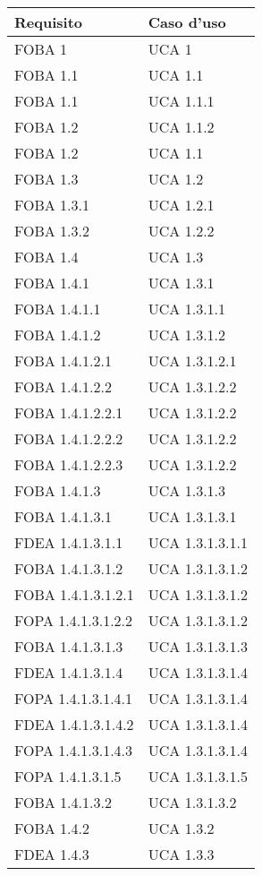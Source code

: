 \begin{longtable}{XX}
\toprule
\textbf{Requisito} & \textbf{Caso d'uso}\\
\midrule
FOBA 1&UCA 1\\
\midrule
FOBA 1.1&UCA 1.1\\
\midrule
FOBA 1.1&UCA 1.1.1\\
\midrule
FOBA 1.2&UCA 1.1.2\\
\midrule
FOBA 1.2&UCA 1.1\\
\midrule
FOBA 1.3&UCA 1.2\\
\midrule
FOBA 1.3.1&UCA 1.2.1\\
\midrule
FOBA 1.3.2&UCA 1.2.2\\
\midrule
FOBA 1.4&UCA 1.3\\
\midrule
FOBA 1.4.1&UCA 1.3.1\\
\midrule
FOBA 1.4.1.1&UCA 1.3.1.1\\
\midrule
FOBA 1.4.1.2&UCA 1.3.1.2\\
\midrule
FOBA 1.4.1.2.1&UCA 1.3.1.2.1\\
\midrule
FOBA 1.4.1.2.2&UCA 1.3.1.2.2\\
\midrule
FOBA 1.4.1.2.2.1&UCA 1.3.1.2.2\\
\midrule
FOBA 1.4.1.2.2.2&UCA 1.3.1.2.2\\
\midrule
FOBA 1.4.1.2.2.3&UCA 1.3.1.2.2\\
\midrule
FOBA 1.4.1.3&UCA 1.3.1.3\\
\midrule
FOBA 1.4.1.3.1&UCA 1.3.1.3.1\\
\midrule
FDEA 1.4.1.3.1.1&UCA 1.3.1.3.1.1\\
\midrule
FOBA 1.4.1.3.1.2&UCA 1.3.1.3.1.2\\
\midrule
FOBA 1.4.1.3.1.2.1&UCA 1.3.1.3.1.2\\
\midrule
FOPA 1.4.1.3.1.2.2&UCA 1.3.1.3.1.2\\
\midrule
FOBA 1.4.1.3.1.3&UCA 1.3.1.3.1.3\\
\midrule
FDEA 1.4.1.3.1.4&UCA 1.3.1.3.1.4\\
\midrule
FOPA 1.4.1.3.1.4.1&UCA 1.3.1.3.1.4\\
\midrule
FDEA 1.4.1.3.1.4.2&UCA 1.3.1.3.1.4\\
\midrule
FOPA 1.4.1.3.1.4.3&UCA 1.3.1.3.1.4\\
\midrule
FOPA 1.4.1.3.1.5&UCA 1.3.1.3.1.5\\
\midrule
FOBA 1.4.1.3.2&UCA 1.3.1.3.2\\
\midrule
FOBA 1.4.2&UCA 1.3.2\\
\midrule
FDEA 1.4.3&UCA 1.3.3\\

\end{longtable}
